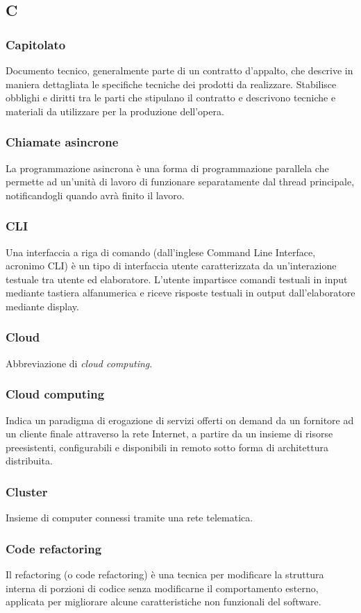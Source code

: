 \subsection*{\textbf{\hfill \Huge{C} \hfill}} 
\subsubsection*{Capitolato}
Documento tecnico, generalmente parte di un contratto d’appalto, che descrive in maniera dettagliata le specifiche tecniche dei prodotti da realizzare. Stabilisce obblighi e diritti tra le parti che stipulano il contratto e descrivono tecniche e materiali da utilizzare per la produzione dell’opera.
\subsubsection*{Chiamate asincrone}
La programmazione asincrona è una forma di programmazione parallela che permette ad un’unità di lavoro di funzionare separatamente dal thread principale, notificandogli quando avrà finito il lavoro.
\subsubsection*{CLI}
Una interfaccia a riga di comando (dall’inglese Command Line Interface, acronimo CLI) è un tipo di interfaccia utente caratterizzata da un’interazione testuale tra utente ed elaboratore. L’utente impartisce comandi testuali in input mediante tastiera alfanumerica e riceve risposte testuali in output dall’elaboratore mediante display.
\subsubsection*{Cloud}
Abbreviazione di \textit{cloud computing}\glos .
\subsubsection*{Cloud computing}
Indica un paradigma di erogazione di servizi offerti on demand da un fornitore ad un cliente finale attraverso la rete Internet, a partire da un insieme di risorse preesistenti, configurabili e disponibili in remoto sotto forma di architettura distribuita.
\subsubsection*{Cluster}
Insieme di computer connessi tramite una rete telematica.
\subsubsection*{Code refactoring}
Il refactoring (o code refactoring) è una tecnica per modificare la struttura interna di porzioni di codice senza modificarne il comportamento esterno, applicata per migliorare alcune caratteristiche non funzionali del software.
